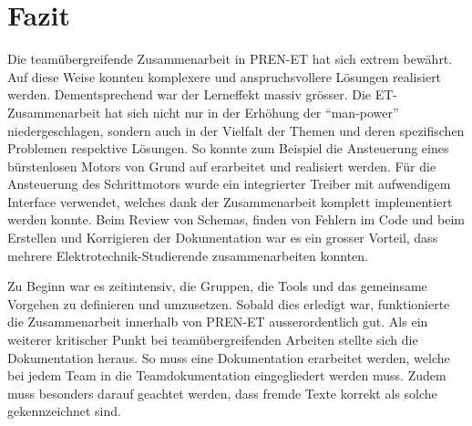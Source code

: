 \ifSTANDALONE
\section{Fazit}
\fi
    Die teamübergreifende Zusammenarbeit in PREN-ET hat sich extrem bewährt. 
    Auf diese Weise konnten komplexere und anspruchsvollere Lösungen 
    realisiert werden. Dementsprechend war der Lerneffekt massiv grösser. Die 
    ET-Zusammenarbeit hat sich nicht nur in der Erhöhung der 
    \enquote{man-power} niedergeschlagen, sondern auch in der Vielfalt der 
    Themen und deren spezifischen Problemen respektive Lösungen. So konnte zum 
    Beispiel die Ansteuerung eines bürstenlosen Motors von Grund auf 
    erarbeitet und realisiert werden. Für die Ansteuerung des Schrittmotors 
    wurde ein integrierter Treiber mit aufwendigem Interface verwendet, 
    welches dank der Zusammenarbeit komplett implementiert werden konnte. Beim 
    Review von Schemas, finden von Fehlern im Code und beim Erstellen und 
    Korrigieren der Dokumentation war es ein grosser Vorteil, dass mehrere 
    Elektrotechnik-Studierende zusammenarbeiten konnten.\ifSTANDALONE
    
    \noindent
    \fi
    Zu Beginn war es zeitintensiv, die Gruppen, die Tools und das gemeinsame 
    Vorgehen zu definieren und umzusetzen. Sobald dies erledigt war, 
    funktionierte die Zusammenarbeit innerhalb von PREN-ET ausserordentlich 
    gut. Als ein weiterer kritischer Punkt bei teamübergreifenden Arbeiten 
    stellte sich die Dokumentation heraus. So muss eine Dokumentation 
    erarbeitet werden, welche bei jedem Team in die Teamdokumentation 
    eingegliedert werden muss. Zudem muss besonders darauf geachtet werden, 
    dass fremde Texte korrekt als solche gekennzeichnet sind. 

